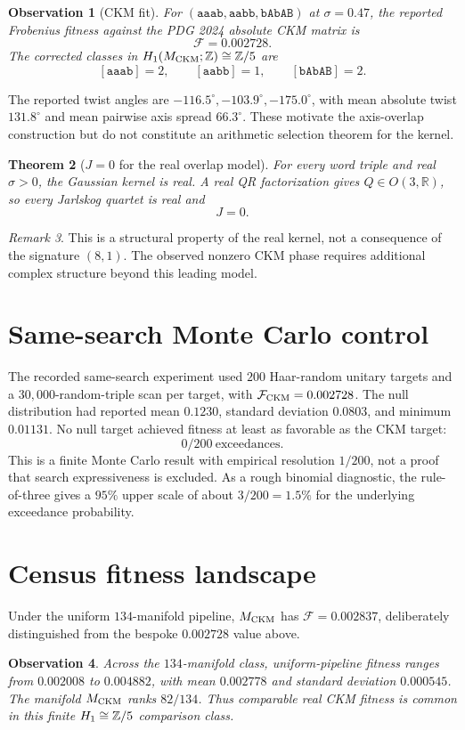 \documentclass[11pt]{article}
\newtheorem{theorem}{Theorem}[section]\newtheorem{proposition}[theorem]{Proposition}
\newtheorem{observation}[theorem]{Observation}\theoremstyle{remark}\newtheorem{remark}[theorem]{Remark}
\newcommand{\M}{M_{\rm CKM}}\newcommand{\K}{K_{10}}\newcommand{\kinv}{k_{\rm inv}}
\begin{document}
\begin{observation}[CKM fit]
For $(\mathtt{aaab},\mathtt{aabb},\mathtt{bAbAB})$ at $\sigma=0.47$,
the reported Frobenius fitness against the PDG 2024 absolute CKM matrix is
\[
\mathcal F=0.002728.
\]
The corrected classes in $H_1(\M;\Z)\cong\Z/5$ are
\[
[\mathtt{aaab}]=2,\qquad[\mathtt{aabb}]=1,\qquad
[\mathtt{bAbAB}]=2.
\]
\end{observation}
The reported twist angles are $-116.5^\circ,-103.9^\circ,-175.0^\circ$,
with mean absolute twist $131.8^\circ$ and mean pairwise axis spread
$66.3^\circ$. These motivate the axis-overlap construction but do not
constitute an arithmetic selection theorem for the kernel.

\begin{theorem}[$J=0$ for the real overlap model]\label{thm:J}
For every word triple and real $\sigma>0$, the Gaussian kernel is real.
A real QR factorization gives $Q\in O(3,\mathbb R)$, so every Jarlskog
quartet is real and
\[
J=0.
\]
\end{theorem}
\begin{remark}
This is a structural property of the real kernel, not a consequence of
the signature $(8,1)$. The observed nonzero CKM phase requires additional
complex structure beyond this leading model.
\end{remark}

\section{Same-search Monte Carlo control}
The recorded same-search experiment used $200$ Haar-random unitary
targets and a $30{,}000$-random-triple scan per target, with
$\mathcal F_{\rm CKM}=0.002728$. The null distribution had reported mean
$0.1230$, standard deviation $0.0803$, and minimum $0.01131$. No null
target achieved fitness at least as favorable as the CKM target:
\[
0/200\ \text{exceedances}.
\]
This is a finite Monte Carlo result with empirical resolution $1/200$,
not a proof that search expressiveness is excluded. As a rough binomial
diagnostic, the rule-of-three gives a $95\%$ upper scale of about
$3/200=1.5\%$ for the underlying exceedance probability.

\section{Census fitness landscape}
Under the uniform $134$-manifold pipeline, $\M$ has
$\mathcal F=0.002837$, deliberately distinguished from the bespoke
$0.002728$ value above.
\begin{observation}
Across the $134$-manifold class, uniform-pipeline fitness ranges from
$0.002008$ to $0.004882$, with mean $0.002778$ and standard deviation
$0.000545$. The manifold $\M$ ranks $82/134$. Thus comparable real CKM
fitness is common in this finite $H_1\cong\mathbb Z/5$ comparison class.
\end{observation}
\end{document}
